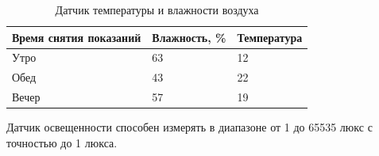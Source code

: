 \begin{table}[H]
    \centering
    \caption{Датчик температуры и влажности воздуха}
    \begin{tabular}{|p{4.3cm}|p{4.3cm}|p{4.3cm}|}
        \hline
        Время снятия показаний & Влажность, \% & Температура \\
        \hline
        Утро & 63 & 12 \\
        \hline
        Обед & 43 & 22 \\
        \hline
        Вечер & 57 & 19 \\
        \hline
    \end{tabular}
    \label{tab:temp_and_wet}
\end{table}

Датчик освещенности способен измерять в диапазоне от 1 до 65535 люкс с точностью до 1 люкса.